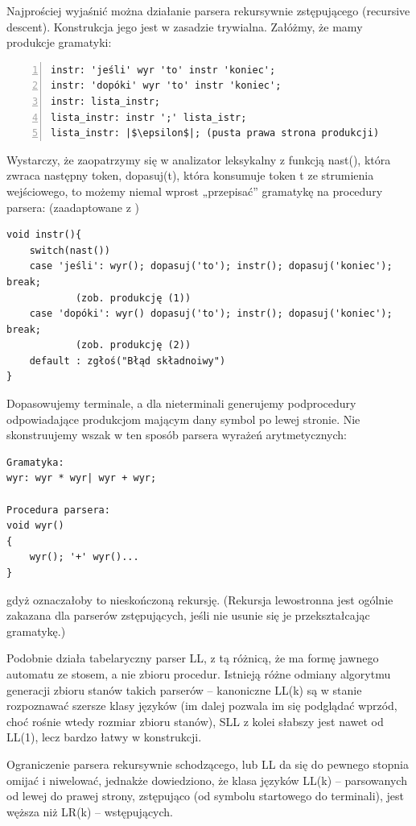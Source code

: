 Najprościej wyjaśnić można działanie parsera rekursywnie zstępującego (recursive descent). Konstrukcja jego jest w zasadzie trywialna. Załóżmy, że mamy produkcje gramatyki:

\begin{lstlisting}[numbers=left]
instr: 'jeśli' wyr 'to' instr 'koniec';
instr: 'dopóki' wyr 'to' instr 'koniec';
instr: lista_instr;
lista_instr: instr ';' lista_istr;
lista_instr: |$\epsilon$|; (pusta prawa strona produkcji)
\end{lstlisting}

Wystarczy, że zaopatrzymy się w analizator leksykalny z funkcją nast(), która zwraca następny token, dopasuj(t), która konsumuje token t ze strumienia wejściowego, to możemy niemal wprost „przepisać” gramatykę na procedury parsera: (zaadaptowane z \cite[str.~70]{DRAGON_BOOK})

\begin{lstlisting}
void instr(){
	switch(nast())
	case 'jeśli': wyr(); dopasuj('to'); instr(); dopasuj('koniec'); break; 
            (zob. produkcję (1))
	case 'dopóki': wyr() dopasuj('to'); instr(); dopasuj('koniec'); break;
            (zob. produkcję (2))
	default : zgłoś("Błąd składnoiwy")
}
\end{lstlisting}
Dopasowujemy terminale, a dla nieterminali generujemy podprocedury odpowiadające produkcjom mającym dany symbol po lewej stronie.
Nie skonstruujemy wszak w ten sposób parsera wyrażeń arytmetycznych:
\lstset{escapechar=@,}
\begin{lstlisting}
Gramatyka: 
wyr: wyr * wyr| wyr + wyr;

Procedura parsera: 
void wyr()
{
    wyr(); '+' wyr()...
}
\end{lstlisting}
\lstset{escapechar=|,}
gdyż oznaczałoby to nieskończoną rekursję. (Rekursja lewostronna jest ogólnie zakazana dla parserów zstępujących, jeśli nie usunie się je przekształcając gramatykę.)

Podobnie działa tabelaryczny parser LL, z tą różnicą, że ma formę jawnego automatu ze stosem, a nie zbioru procedur. Istnieją różne odmiany algorytmu generacji zbioru stanów takich parserów – kanoniczne LL(k) są w stanie rozpoznawać szersze klasy języków (im dalej pozwala im się podglądać wprzód, choć rośnie wtedy rozmiar zbioru stanów), SLL z kolei słabszy jest nawet od LL(1), lecz bardzo łatwy w konstrukcji\cite{DRAGON_BOOK}.

Ograniczenie parsera rekursywnie schodzącego, lub LL da się do pewnego stopnia omijać i niwelować, jednakże dowiedziono\cite{Nijholt}, że klasa języków LL(k) – parsowanych od lewej do prawej strony, zstępująco (od symbolu startowego do terminali), jest węższa niż LR(k) – wstępujących.

